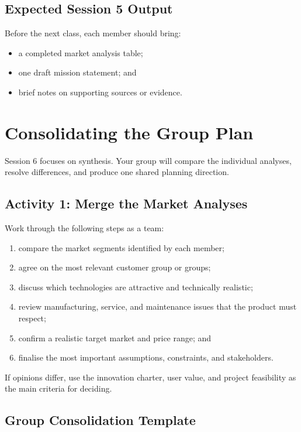 \subsection{Expected Session 5 Output}

Before the next class, each member should bring:
\begin{itemize}
    \item a completed market analysis table;
    \item one draft mission statement; and
    \item brief notes on supporting sources or evidence.
\end{itemize}

\section{Consolidating the Group Plan}

Session 6 focuses on synthesis. Your group will compare the individual analyses, resolve differences, and produce one shared planning direction.

\subsection{Activity 1: Merge the Market Analyses}

Work through the following steps as a team:
\begin{enumerate}
    \item compare the market segments identified by each member;
    \item agree on the most relevant customer group or groups;
    \item discuss which technologies are attractive and technically realistic;
    \item review manufacturing, service, and maintenance issues that the product must respect;
    \item confirm a realistic target market and price range; and
    \item finalise the most important assumptions, constraints, and stakeholders.
\end{enumerate}

If opinions differ, use the innovation charter, user value, and project feasibility as the main criteria for deciding.

\subsection{Group Consolidation Template}

